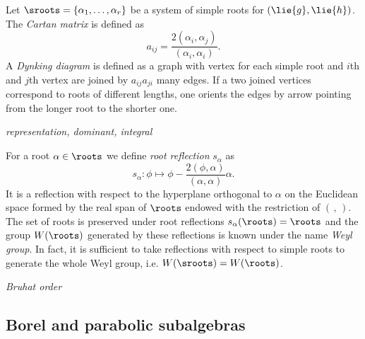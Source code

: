 Let $\sroots=\{ \alpha_1, \ldots, \alpha_r \}$ be a system of simple roots for $(\lie{g},\lie{h})$. The \emph{Cartan matrix} is defined as
\[
 a_{ij} =\frac{2(\alpha_i,\alpha_j)}{(\alpha_i,\alpha_i)}.
\]
A \emph{Dynking diagram} is defined as a graph with vertex for each simple root and $i$th and $j$th vertex are joined by $a_{ij}a_{ji}$ many edges. If a two joined vertices correspond to roots of different lengths, one orients the edges by arrow pointing from the longer root to the shorter one.




\emph{representation, dominant, integral} %

For a root $\alpha \in \roots$ we define \emph{root reflection} $s_\alpha$ as
\[
 s_\alpha: \phi \mapsto \phi - \frac{2(\phi,\alpha)}{(\alpha,\alpha)}\alpha.
\] It is a reflection with respect to the hyperplane orthogonal to $\alpha$ on the Euclidean space formed by the real span of $\roots$ endowed with the restriction of $(\, , \,)$. The set of roots is preserved under root reflections \( s_\alpha(\roots) = \roots\) and the group $W(\roots)$ generated by these reflections is known under the name \emph{Weyl group}. In fact, it is sufficient to take reflections with respect to simple roots to generate the whole Weyl group, i.e. $W(\sroots) = W(\roots)$.

\emph{Bruhat order}%

\subsection{Borel and parabolic subalgebras}

